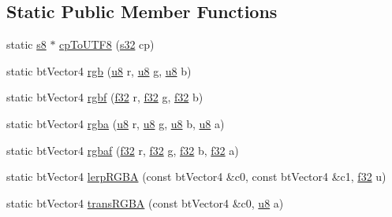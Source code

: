 \subsection*{Static Public Member Functions}
\begin{DoxyCompactItemize}
\item 
static \mbox{\hyperlink{_util_8h_a2ff401e087cf786c38a6812723e94473}{s8}} $\ast$ \mbox{\hyperlink{classnjli_1_1_world_h_u_d_ac3d6f31e35e126ffb9af9f16f286b708}{cp\+To\+U\+T\+F8}} (\mbox{\hyperlink{_util_8h_aa62c75d314a0d1f37f79c4b73b2292e2}{s32}} cp)
\item 
static bt\+Vector4 \mbox{\hyperlink{classnjli_1_1_world_h_u_d_a057b36c3804580659d26ae95e2d1ea15}{rgb}} (\mbox{\hyperlink{_util_8h_aed742c436da53c1080638ce6ef7d13de}{u8}} r, \mbox{\hyperlink{_util_8h_aed742c436da53c1080638ce6ef7d13de}{u8}} g, \mbox{\hyperlink{_util_8h_aed742c436da53c1080638ce6ef7d13de}{u8}} b)
\item 
static bt\+Vector4 \mbox{\hyperlink{classnjli_1_1_world_h_u_d_af703ccb0ab75c3910a7c23830920a652}{rgbf}} (\mbox{\hyperlink{_util_8h_a5f6906312a689f27d70e9d086649d3fd}{f32}} r, \mbox{\hyperlink{_util_8h_a5f6906312a689f27d70e9d086649d3fd}{f32}} g, \mbox{\hyperlink{_util_8h_a5f6906312a689f27d70e9d086649d3fd}{f32}} b)
\item 
static bt\+Vector4 \mbox{\hyperlink{classnjli_1_1_world_h_u_d_a22066a9b3240694ba4fb8d5c7c26ac06}{rgba}} (\mbox{\hyperlink{_util_8h_aed742c436da53c1080638ce6ef7d13de}{u8}} r, \mbox{\hyperlink{_util_8h_aed742c436da53c1080638ce6ef7d13de}{u8}} g, \mbox{\hyperlink{_util_8h_aed742c436da53c1080638ce6ef7d13de}{u8}} b, \mbox{\hyperlink{_util_8h_aed742c436da53c1080638ce6ef7d13de}{u8}} a)
\item 
static bt\+Vector4 \mbox{\hyperlink{classnjli_1_1_world_h_u_d_ad4c434cddbeba1a62562585c012a8693}{rgbaf}} (\mbox{\hyperlink{_util_8h_a5f6906312a689f27d70e9d086649d3fd}{f32}} r, \mbox{\hyperlink{_util_8h_a5f6906312a689f27d70e9d086649d3fd}{f32}} g, \mbox{\hyperlink{_util_8h_a5f6906312a689f27d70e9d086649d3fd}{f32}} b, \mbox{\hyperlink{_util_8h_a5f6906312a689f27d70e9d086649d3fd}{f32}} a)
\item 
static bt\+Vector4 \mbox{\hyperlink{classnjli_1_1_world_h_u_d_ab754f469fe9aa8facaa81537f51d5c9a}{lerp\+R\+G\+BA}} (const bt\+Vector4 \&c0, const bt\+Vector4 \&c1, \mbox{\hyperlink{_util_8h_a5f6906312a689f27d70e9d086649d3fd}{f32}} u)
\item 
static bt\+Vector4 \mbox{\hyperlink{classnjli_1_1_world_h_u_d_a62ce15067e1954e3c1a1d861bf1f3ca6}{trans\+R\+G\+BA}} (const bt\+Vector4 \&c0, \mbox{\hyperlink{_util_8h_aed742c436da53c1080638ce6ef7d13de}{u8}} a)

\end{DoxyCompactItemize}
